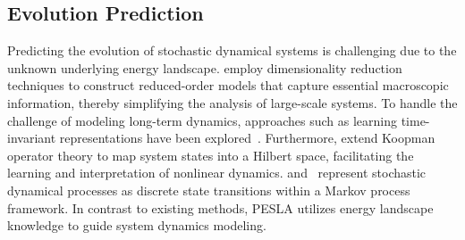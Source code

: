 \subsection{Evolution Prediction}

Predicting the evolution of stochastic dynamical systems is challenging due to the unknown underlying energy landscape. \citet{vlachas2022multiscale} employ dimensionality reduction techniques to construct reduced-order models that capture essential macroscopic information, thereby simplifying the analysis of large-scale systems. To handle the challenge of modeling long-term dynamics, approaches such as learning time-invariant representations have been explored~\citep{federicilatent, kostic2024learning, li2023learning}. Furthermore, \citet{kostic2022learning, kostic2024sharp} extend Koopman operator theory to map system states into a Hilbert space, facilitating the learning and interpretation of nonlinear dynamics. \citet{wu2018deep} and~\citet{seifner2023neural} represent stochastic dynamical processes as discrete state transitions within a Markov process framework. In contrast to existing methods, PESLA utilizes energy landscape knowledge to guide system dynamics modeling.